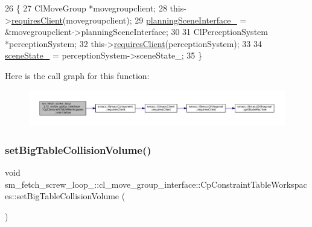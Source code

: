 \begin{DoxyCode}
26         \{
27             ClMoveGroup *movegroupclient;
28             this->\hyperlink{classsmacc_1_1ISmaccComponent_a36c085d906fbae0fcaee817aaeafebf4}{requiresClient}(movegroupclient);
29             \hyperlink{classsm__fetch__screw__loop__1_1_1cl__move__group__interface_1_1CpConstraintTableWorkspaces_a359b7c6bc0fe586c3acaef54981dfa91}{planningSceneInterface\_} = &movegroupclient->planningSceneInterface;
30 
31             ClPerceptionSystem *perceptionSystem;
32             this->\hyperlink{classsmacc_1_1ISmaccComponent_a36c085d906fbae0fcaee817aaeafebf4}{requiresClient}(perceptionSystem);
33 
34             \hyperlink{classsm__fetch__screw__loop__1_1_1cl__move__group__interface_1_1CpConstraintTableWorkspaces_ae49397b918179c999bd9d4b1c785713f}{sceneState\_} = perceptionSystem->sceneState\_;
35         \}
\end{DoxyCode}
Here is the call graph for this function\+:
\nopagebreak
\begin{figure}[H]
\begin{center}
\leavevmode
\includegraphics[width=350pt]{classsm__fetch__screw__loop__1_1_1cl__move__group__interface_1_1CpConstraintTableWorkspaces_a813b53264563225547f31651fd5b3f76_cgraph}
\end{center}
\end{figure}
\mbox{\label{classsm__fetch__screw__loop__1_1_1cl__move__group__interface_1_1CpConstraintTableWorkspaces_ae9bf6937e39e58a069bce3d02b617402}} 
\subsubsection{\texorpdfstring{set\+Big\+Table\+Collision\+Volume()}{setBigTableCollisionVolume()}}
{\footnotesize\ttfamily void sm\+\_\+fetch\+\_\+screw\+\_\+loop\+\_\+::cl\+\_\+move\+\_\+group\+\_\+interface\+::\+Cp\+Constraint\+Table\+Workspaces\+::set\+Big\+Table\+Collision\+Volume (\begin{DoxyParamCaption}{ }\end{DoxyParamCaption})}




